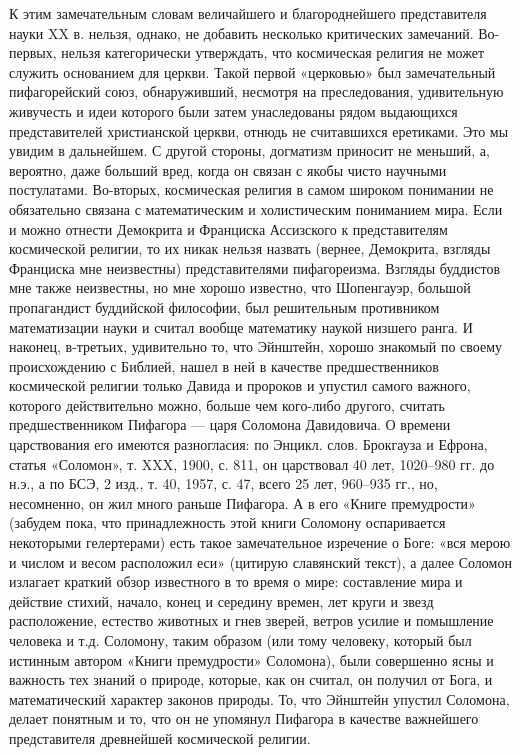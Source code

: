 К   этим   замечательным    словам   величайшего   и   благороднейшего
представителя  науки  XX  в.  нельзя, однако,  не  добавить  несколько
критических замечаний. Во-первых, нельзя категорически утверждать, что
космическая  религия не  может  служить основанием  для церкви.  Такой
первой «церковью» был  замечательный пифагорейский союз, обнаруживший,
несмотря  на преследования,  удивительную  живучесть  и идеи  которого
были затем  унаследованы рядом выдающихся  представителей христианской
церкви, отнюдь не считавшихся еретиками. Это мы увидим в дальнейшем. С
другой  стороны,  догматизм приносит  не  меньший,  а, вероятно,  даже
больший  вред, когда  он связан  с якобы  чисто научными  постулатами.
Во-вторых,   космическая  религия   в  самом   широком  понимании   не
обязательно связана с математическим  и холистическим пониманием мира.
Если и можно отнести Демокрита и Франциска Ассизского к представителям
космической религии,  то их  никак нельзя назвать  (вернее, Демокрита,
взгляды  Франциска   мне  неизвестны)   представителями  пифагореизма.
Взгляды буддистов  мне также неизвестны,  но мне хорошо  известно, что
Шопенгауэр, большой пропагандист буддийской философии, был решительным
противником  математизации науки  и  считал  вообще математику  наукой
низшего  ранга. И  наконец, в-третьих,  удивительно то,  что Эйнштейн,
хорошо  знакомый по  своему происхождению  с  Библией, нашел  в ней  в
качестве предшественников космической религии только Давида и пророков
и  упустил самого  важного, которого  действительно можно,  больше чем
кого-либо другого, считать предшественником Пифагора --- царя Соломона
Давидовича. О времени царствования его имеются разногласия: по Энцикл.
слов. Брокгауза и  Ефрона, статья «Соломон», т. XXX, 1900,  с. 811, он
царствовал  40 лет,  1020--980  гг. до  н.э.,  а по  БСЭ,  2 изд.,  т.
40,  1957, с.  47,  всего 25  лет, 960--935  гг.,  но, несомненно,  он
жил  много  раньше Пифагора.  А  в  его «Книге  премудрости»  (забудем
пока, что  принадлежность этой книги Соломону  оспаривается некоторыми
гелертерами)  есть такое  замечательное изречение  о Боге:  «вся мерою
и  числом  и  весом  расположил еси»  (цитирую  славянский  текст),  а
далее Соломон  излагает краткий  обзор известного в  то время  о мире:
составление мира и  действие стихий, начало, конец  и середину времен,
лет  круги и  звезд  расположение, естество  животных  и гнев  зверей,
ветров усилие  и помышление  человека и  т.д. Соломону,  таким образом
(или тому  человеку, который был истинным  автором «Книги премудрости»
Соломона),  были совершенно  ясны  и важность  тех  знаний о  природе,
которые, как он считал, он  получил от Бога, и математический характер
законов природы. То, что Эйнштейн  упустил Соломона, делает понятным и
то, что  он не упомянул  Пифагора в качестве  важнейшего представителя
древнейшей космической религии.

